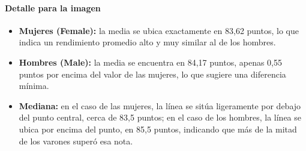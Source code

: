 

\paragraph{Detalle para la imagen}
\begin{itemize}
    \item \textbf{Mujeres (Female):} la media se ubica exactamente en 83,62 puntos, lo que indica un rendimiento promedio alto y muy similar al de los hombres.
    \item \textbf{Hombres (Male):} la media se encuentra en 84,17 puntos, apenas 0,55 puntos por encima del valor de las mujeres, lo que sugiere una diferencia mínima.
    \item \textbf{Mediana:} en el caso de las mujeres, la línea se sitúa ligeramente por debajo del punto central, cerca de 83,5 puntos; en el caso de los hombres, la línea se ubica por encima del punto, en 85,5 puntos, indicando que más de la mitad de los varones superó esa nota.
\end{itemize}
